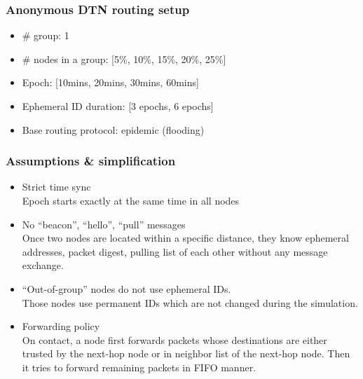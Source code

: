 \documentclass[11pt]{article}
\begin{document}
\subsubsection{Anonymous DTN routing setup}
\begin{itemize}
 \item \# group: 1
 \item \# nodes in a group: [5\%, 10\%, 15\%, 20\%, 25\%]
 \item Epoch: [10mins, 20mins, 30mins, 60mins]
 \item Ephemeral ID duration: [3 epochs, 6 epochs]
 \item Base routing protocol: epidemic (flooding)
\end{itemize}



\subsubsection{Assumptions \& simplification}
\begin{itemize}

 \item Strict time sync\\
Epoch starts exactly at the same time in all nodes

 \item No ``beacon'', ``hello'', ``pull'' messages\\
 Once two nodes are located within a specific distance, they know ephemeral addresses, packet digest, pulling list of each other without any message exchange. 

 \item ``Out-of-group'' nodes do not use ephemeral IDs.\\
 Those nodes use permanent IDs which are not changed during the simulation.

 \item Forwarding policy\\
On contact, a node first forwards packets whose destinations are either trusted by the next-hop node or in neighbor list of the next-hop node.  Then it tries to forward remaining packets in FIFO manner. 
\end{itemize}
\end{document}
